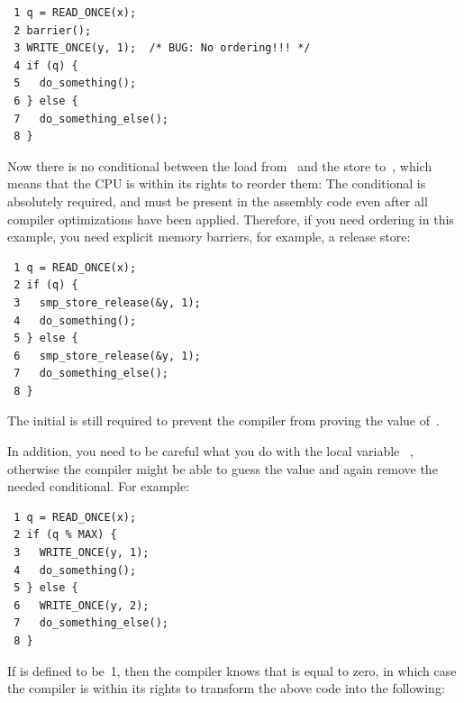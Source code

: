 \begin{enumerate}
\vspace{5pt}
\begin{minipage}[t]{\columnwidth}
\scriptsize
\begin{verbatim}
 1 q = READ_ONCE(x);
 2 barrier();
 3 WRITE_ONCE(y, 1);  /* BUG: No ordering!!! */
 4 if (q) {
 5   do_something();
 6 } else {
 7   do_something_else();
 8 }
\end{verbatim}
\end{minipage}
\vspace{5pt}

Now there is no conditional between the load from~ and the store
to~, which means that the CPU is within its rights to reorder them:
The conditional is absolutely required, and must be present in the
assembly code even after all compiler optimizations have been applied.
Therefore, if you need ordering in this example, you need explicit
memory barriers, for example, a release store:

\vspace{5pt}
\begin{minipage}[t]{\columnwidth}
\scriptsize
\begin{verbatim}
 1 q = READ_ONCE(x);
 2 if (q) {
 3   smp_store_release(&y, 1);
 4   do_something();
 5 } else {
 6   smp_store_release(&y, 1);
 7   do_something_else();
 8 }
\end{verbatim}
\end{minipage}
\vspace{5pt}

The initial  is still required to prevent the compiler from
proving the value of~.

In addition, you need to be careful what you do with the local variable~%
,
otherwise the compiler might be able to guess the value and again remove
the needed conditional.
For example:

\vspace{5pt}
\begin{minipage}[t]{\columnwidth}
\scriptsize
\begin{verbatim}
 1 q = READ_ONCE(x);
 2 if (q % MAX) {
 3   WRITE_ONCE(y, 1);
 4   do_something();
 5 } else {
 6   WRITE_ONCE(y, 2);
 7   do_something_else();
 8 }
\end{verbatim}
\end{minipage}
\vspace{5pt}

If  is defined to be~1, then the compiler knows that  is
equal to zero, in which case the compiler is within its rights to
transform the above code into the following:


\end{enumerate}
